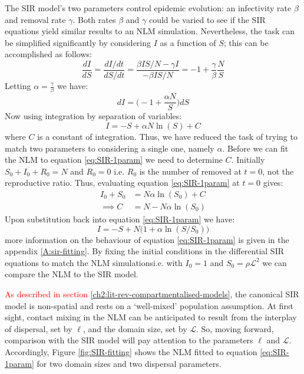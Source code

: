 The SIR model's two parameters control epidemic evolution: an infectivity rate $\beta$ and removal rate $\gamma$. 
Both rates $\beta$ and $\gamma$ could be varied to see if the SIR equations yield similar results to an NLM simulation. Nevertheless, the task can be simplified significantly by considering $I$ as a function of $S$; this can be accomplished as follows:
\[
\frac{dI}{dS}=\frac{dI / dt}{dS /dt}= \frac{\beta IS/N - \gamma I}{-\beta IS/N} = -1 + \frac{\gamma}{\beta} \frac{N}{S} \]
Letting $\alpha = \frac{\gamma}{\beta}$ we have:
\[
    dI = \Big(-1 + \frac{\alpha N}{S}\Big)dS
\]
Now using integration by separation of variables:
\begin{equation}
\label{eq:SIR-1param}
     I = -S + \alpha N \ln (S) + C
\end{equation}
where $C$ is a constant of integration. Thus, we have reduced the task of trying to match two parameters to considering a single one, namely $\alpha$. Before we can fit the NLM to equation \ref{eq:SIR-1param} we need to determine $C$. Initially $S_0 + I_0 + R_0= N$ and $R_0=0$ i.e. $R_0$ is the number of removed at $t=0$, not the reproductive ratio. Thus, evaluating equation \ref{eq:SIR-1param} at $t=0$ gives:
\begin{align*}
I_0 + S_0 & = N \alpha\ln (S_0) + C\\ 
 \implies C &= N - N \alpha \ln (S_0) 
\end{align*}
Upon substitution back into equation \ref{eq:SIR-1param} we have:
\begin{equation}
\label{eq:SIR-1param1}
    I = -S + N\big(1 + \alpha \ln (S/S_0)\big)
\end{equation}
more information on the behaviour of equation \ref{eq:SIR-1param} is given in the appendix \ref{A:sir-fitting}.
By fixing the initial conditions in the differential SIR equations to match the NLM simulations\textemdash i.e. with $I_0=1$ and $S_0=\rho \mathcal{L}^2$ \textemdash we can compare the NLM to the SIR model.

\textcolor{red}{As described in section \ref{ch2:lit-rev-compartmentalised-models}}, the canonical SIR model is non-spatial and rests on a `well-mixed' population assumption.
At first sight, contact mixing in the NLM can be anticipated to result from the interplay of dispersal, set by $\ell$, and the domain size, set by $\mathcal{L}$.
So, moving forward, comparison with the SIR model will pay attention to the parameters $\ell$ and $\mathcal{L}$. Accordingly, Figure \ref{fig:SIR-fitting} shows the NLM fitted to equation \ref{eq:SIR-1param} for two domain sizes and two dispersal parameters.


